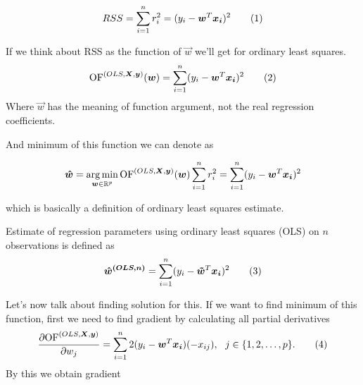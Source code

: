 \begin{equation}
    RSS = \sum\limits_{i=1}^n r_i^2 = (y_i - \vec{w}^T\vec{x_i})^2 \numberthis
\end{equation}

\begin{definition} If we think about RSS as the function of $\vec{w}$ we'll get  for ordinary least squares. 
    \begin{equation}
        \of^{(OLS,\vec{X}, \vec{y})}(\vec{w}) = \sum\limits_{i=1}^n (y_i - \vec{w}^T\vec{x_i})^2 \numberthis
    \end{equation}
Where $\vec{w}$ has the meaning of function argument, not the real regression coefficients.
\end{definition}

And minimum of this function we can denote as 




\begin{equation}
    \boldsymbol{\hat{w}} = \operatorname*{arg\,min}_{\boldsymbol{w} \in \mathbb{R}^p} \operatorname{OF}^{(OLS,\boldsymbol{X}, \boldsymbol{y})}(\boldsymbol{w}) 
    \sum\limits_{i=1}^n r_i^2 = \sum\limits_{i=1}^n (y_i - \boldsymbol{w}^T\boldsymbol{x_i})^2 
\end{equation}

which is basically a definition of ordinary least squares estimate.

\begin{definition} Estimate of regression parameters using ordinary least squares (OLS) on $n$ observations is defined as
    \begin{equation}
        \vec{\hat{w}^{(OLS, n)}} =  \sum\limits_{i=1}^n (y_i - \vec{\tilde{w}}^T\vec{x_i})^2 \numberthis
    \end{equation}
\end{definition}

Let's now talk about finding solution for this. If we want to find minimum of this function, first we need to find gradient by calculating all partial derivatives
\begin{equation}
    \frac{\partial {\of^{(OLS,\vec{X}, \vec{y})}} }{\partial w_j} = \sum\limits_{i=1}^n 2(y_i - \vec{w}^T\vec{x_i})(-x_{ij}) \\, \ \ j \in \{{1,2,\ldots,p\}}. \numberthis
\end{equation}
By this we obtain gradient 

